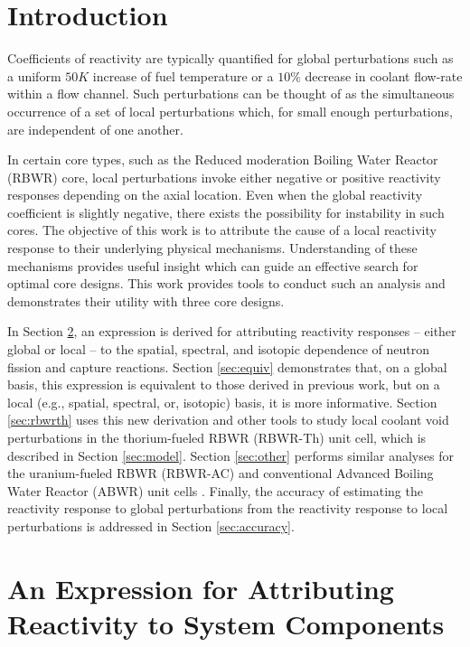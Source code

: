 \documentclass[11pt]{article}
\begin{document}
\pagebreak

\section{Introduction}
\label{sec:intro}

Coefficients of reactivity are typically quantified for global perturbations such as a uniform $50K$ increase of fuel temperature or a $10\%$ decrease in coolant flow-rate within a flow channel.
Such perturbations can be thought of as the simultaneous occurrence of a set of local perturbations which, for small enough perturbations, are independent of one another.

In certain core types, such as the Reduced moderation Boiling Water Reactor (RBWR) \cite{ganda2012sst,takeda2007blt} core, local perturbations invoke either negative or positive reactivity responses depending on the axial location.
Even when the global reactivity coefficient is slightly negative, there exists the possibility for instability in such cores.
The objective of this work is to attribute the cause of a local reactivity response to their underlying physical mechanisms.
Understanding of these mechanisms provides useful insight which can guide an effective search for optimal core designs.
This work provides tools to conduct such an analysis and demonstrates their utility with three core designs.

In Section \ref{sec:derive}, an expression is derived for attributing reactivity responses -- either global or local -- to the spatial, spectral, and isotopic dependence of neutron fission and capture reactions.
Section \ref{sec:equiv} demonstrates that, on a global basis, this expression is equivalent to those derived in previous work, but on a local (e.g., spatial, spectral, or, isotopic) basis, it is more informative.
Section \ref{sec:rbwrth} uses this new derivation and other tools to study local coolant void perturbations in the thorium-fueled RBWR (RBWR-Th) \cite{ganda2012sst} unit cell, which is described in Section \ref{sec:model}.
Section \ref{sec:other} performs similar analyses for the uranium-fueled RBWR (RBWR-AC) \cite{takeda2007blt} and conventional Advanced Boiling Water Reactor (ABWR) unit cells \cite{fennern2007asr}.
Finally, the accuracy of estimating the reactivity response to global perturbations from the reactivity response to local perturbations is addressed in Section \ref{sec:accuracy}.

\section{An Expression for Attributing Reactivity to System Components}
\label{sec:derive}
\end{document}

